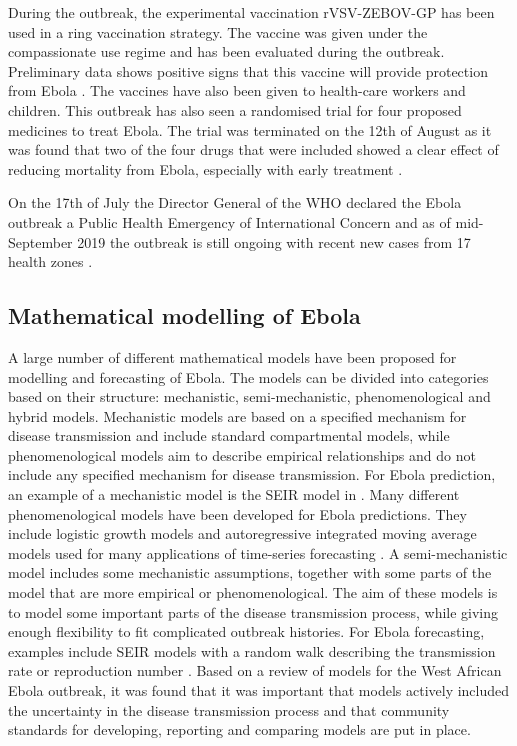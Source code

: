 \documentclass[12pt]{article}
\begin{document}
During the outbreak, the experimental vaccination rVSV-ZEBOV-GP has been used in a ring vaccination strategy. The vaccine was given under the compassionate use regime and has been evaluated during the outbreak. Preliminary data shows positive signs that this vaccine will provide protection from Ebola \cite{organizationPreliminaryResultsEfficacy2019}. The vaccines have also been given to health-care workers and children. This outbreak has also seen a randomised trial for four proposed medicines to treat Ebola. The trial was terminated on the 12th of August as it was found that two of the four drugs that were included showed a clear effect of reducing mortality from Ebola, especially with early treatment \cite{nationalinstituteofallergyandinfectiousdiseasesIndependentMonitoringBoard2019}.

On the 17th of July the Director General of the WHO declared the Ebola outbreak a Public Health Emergency of International Concern \cite{worldhealthorganizationEbolaOutbreakDRC2019} and as of mid-September 2019 the outbreak is still ongoing with recent new cases from 17 health zones \cite{worldhealthorganizationEbolaOutbreakDRC2019b}. 

\subsection{Mathematical modelling of Ebola}

A large number of different mathematical models have been proposed for modelling and forecasting of Ebola\cite{chretienMathematicalModelingWest,viboudRAPIDDEbolaForecasting2018}. The models can be divided into categories based on their structure: mechanistic, semi-mechanistic, phenomenological and hybrid models. Mechanistic models are based on a specified mechanism for disease transmission and include standard compartmental models, while phenomenological models aim to describe empirical relationships and do not include any specified mechanism for disease transmission. For Ebola prediction, an example of a mechanistic model is the SEIR model in \cite{gaffeyApplicationCDCEbolaResponse2018}. Many different phenomenological models have been developed for Ebola predictions. They include logistic growth models \cite{pellUsingPhenomenologicalModels2018} and autoregressive integrated moving average models used for many applications of time-series forecasting \cite{mForecastingTrendCases2017}. A semi-mechanistic model includes some mechanistic assumptions, together with some parts of the model that are more empirical or phenomenological. The aim of these models is to model some important parts of the disease transmission process, while giving enough flexibility to fit complicated outbreak histories. For Ebola forecasting, examples include SEIR models with a random walk describing the transmission rate or reproduction number  \cite{funkAssessingPerformanceRealtime2019,asherForecastingEbolaRegression2018}. Based on a review of models for the West African Ebola outbreak, it was found that it was important that models actively included the uncertainty in the disease transmission process \cite{chretienMathematicalModelingWest, kingAvoidableErrorsModelling2015} and that community standards for developing, reporting and comparing models are put in place. 
\end{document}
